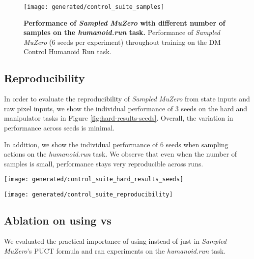 \documentclass{article}
\newcommand{\smuzero}{\emph{Sampled MuZero}}
\begin{document}
\begin{figure}
\texttt{[image: generated/control\_suite\_samples]}
\vspace*{-7mm}
\caption[]{
\label{fig:control-suite-samples}
\textbf{Performance of \smuzero{} with different number of samples on the \emph{humanoid.run} task.} Performance of \smuzero{}  (6 seeds per experiment) throughout training on the DM Control Humanoid Run task.
}
\end{figure}

\subsection{Reproducibility}
In order to evaluate the reproducibility of \smuzero{} from state inputs and raw pixel inputs, we show the individual performance of 3 seeds on the hard and manipulator tasks in Figure \ref{fig:hard-results-seeds}. Overall, the variation in performance across seeds is minimal.

In addition, we show the individual performance of 6 seeds when sampling  actions on the \emph{humanoid.run} task. We observe that even when the number of samples is small, performance stays very reproducible across runs.

\begin{figure*}
\texttt{[image: generated/control\_suite\_hard\_results\_seeds]}
\vspace*{-7mm}
\caption[]{
\label{fig:hard-results-seeds}
\textbf{Reproducibility of \smuzero{} from state and raw pixel inputs on the hard and manipulator tasks.} Performance of \smuzero{} (3 seeds per experiment) throughout training on the DM Control Humanoid Run task.
}
\end{figure*}

\begin{figure*}
\texttt{[image: generated/control\_suite\_reproducibility]}
\vspace*{-7mm}
\caption[]{
\label{fig:control-suite-reproducibility}
\textbf{Reproducibility of \smuzero{} on the \emph{humanoid.run} task with 3, 5, 10, 20 and 40 action samples.} Performance of \smuzero{} (6 seeds per experiment) throughout training on the DM Control Humanoid Run task.
}
\end{figure*}

\subsection{Ablation on using  vs }
We evaluated the practical importance of using  instead of just  in \smuzero{}'s PUCT formula and ran experiments on the \emph{humanoid.run} task.
\end{document}
